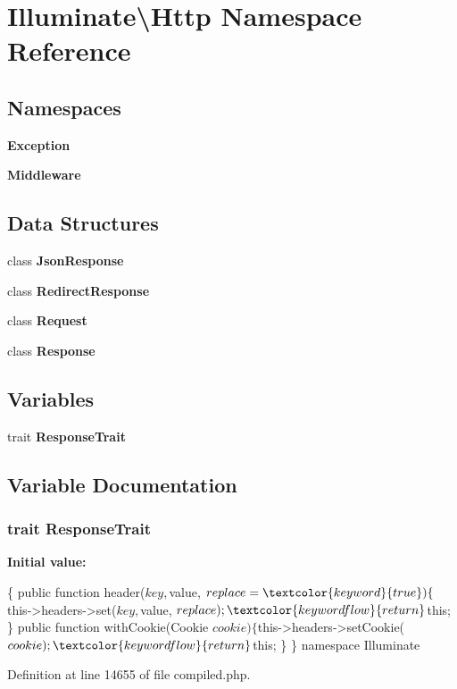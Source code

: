 \section{Illuminate\textbackslash{}Http Namespace Reference}
\label{namespace_illuminate_1_1_http}
\subsection*{Namespaces}
\begin{DoxyCompactItemize}
\item 
 {\bf Exception}
\item 
 {\bf Middleware}
\end{DoxyCompactItemize}
\subsection*{Data Structures}
\begin{DoxyCompactItemize}
\item 
class {\bf Json\+Response}
\item 
class {\bf Redirect\+Response}
\item 
class {\bf Request}
\item 
class {\bf Response}
\end{DoxyCompactItemize}
\subsection*{Variables}
\begin{DoxyCompactItemize}
\item 
trait {\bf Response\+Trait}
\end{DoxyCompactItemize}


\subsection{Variable Documentation}
\subsubsection[{Response\+Trait}]{\setlength{\rightskip}{0pt plus 5cm}trait Response\+Trait}\label{namespace_illuminate_1_1_http_a2c30a88dbd815928f293d3cd544e9a63}
{\bfseries Initial value\+:}
\begin{DoxyCode}
\{
    \textcolor{keyword}{public} \textcolor{keyword}{function} header($key, $value, $replace = \textcolor{keyword}{true})
    \{
        $this->headers->set($key, $value, $replace);
        \textcolor{keywordflow}{return} $this;
    \}
    \textcolor{keyword}{public} \textcolor{keyword}{function} withCookie(Cookie $cookie)
    \{
        $this->headers->setCookie($cookie);
        \textcolor{keywordflow}{return} $this;
    \}
\}
\textcolor{keyword}{namespace }Illuminate\Http
\end{DoxyCode}


Definition at line 14655 of file compiled.\+php.

